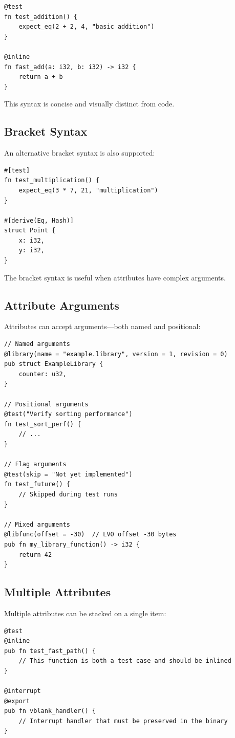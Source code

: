 \begin{lstlisting}
@test
fn test_addition() {
    expect_eq(2 + 2, 4, "basic addition")
}

@inline
fn fast_add(a: i32, b: i32) -> i32 {
    return a + b
}
\end{lstlisting}

This syntax is concise and visually distinct from code.

\subsection{Bracket Syntax}

An alternative bracket syntax is also supported:

\begin{lstlisting}
#[test]
fn test_multiplication() {
    expect_eq(3 * 7, 21, "multiplication")
}

#[derive(Eq, Hash)]
struct Point {
    x: i32,
    y: i32,
}
\end{lstlisting}

The bracket syntax is useful when attributes have complex arguments.

\subsection{Attribute Arguments}

Attributes can accept arguments---both named and positional:

\begin{lstlisting}
// Named arguments
@library(name = "example.library", version = 1, revision = 0)
pub struct ExampleLibrary {
    counter: u32,
}

// Positional arguments
@test("Verify sorting performance")
fn test_sort_perf() {
    // ...
}

// Flag arguments
@test(skip = "Not yet implemented")
fn test_future() {
    // Skipped during test runs
}

// Mixed arguments
@libfunc(offset = -30)  // LVO offset -30 bytes
pub fn my_library_function() -> i32 {
    return 42
}
\end{lstlisting}

\subsection{Multiple Attributes}

Multiple attributes can be stacked on a single item:

\begin{lstlisting}
@test
@inline
pub fn test_fast_path() {
    // This function is both a test case and should be inlined
}

@interrupt
@export
pub fn vblank_handler() {
    // Interrupt handler that must be preserved in the binary
}
\end{lstlisting}

